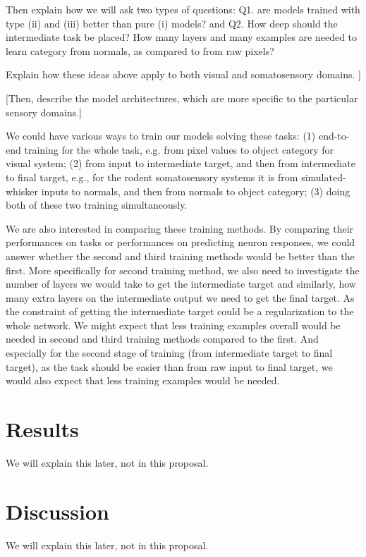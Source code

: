 \documentclass[12pt]{article}
\begin{document}
Then explain how we will ask two types of questions: Q1.  are models trained with type (ii) and (iii) better than pure (i) models?  and Q2. How deep should the intermediate task be placed?  How many layers and many examples are needed to learn category from normals, as compared to from raw pixels?

Explain how these ideas above apply to both visual and somatosensory domains.
]

[Then, describe the model architectures, which are more specific to the particular sensory domains.]

We could have various ways to train our models solving these tasks: (1) end-to-end training for the whole task, e.g. from pixel values to object category for visual system; (2) from input to intermediate target, and then from intermediate to final target, e.g., for the rodent somatosensory systems it is from simulated-whisker inputs to normals, and then from normals to object category; (3) doing both of these two training simultaneously.

We are also interested in comparing these training methods. By comparing their performances on tasks or performances on predicting neuron responses, we could answer whether the second and third training methods would be better than the first. More specifically for second training method, we also need to investigate the number of layers we would take to get the intermediate target and similarly, how many extra layers on the intermediate output we need to get the final target. As the constraint of getting the intermediate target could be a regularization to the whole network. We might expect that less training examples overall would be needed in second and third training methods compared to the first. And especially for the second stage of training (from intermediate target to final target), as the task should be easier than from raw input to final target, we would also expect that less training examples would be needed.

\section*{Results}

We will explain this later, not in this proposal.

\section*{Discussion}

We will explain this later, not in this proposal.



%
%

\end{document}
